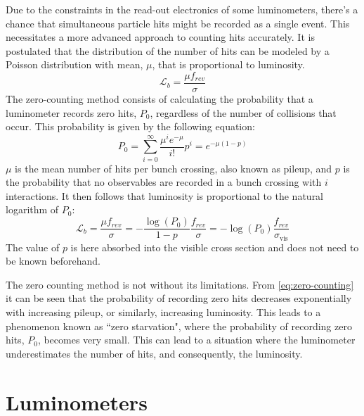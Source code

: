 Due to the constraints in the read-out electronics of some luminometers, there's a chance that simultaneous particle hits might be recorded as a single event. This necessitates a more advanced approach to counting hits accurately. It is postulated that the distribution of the number of hits can be modeled by a Poisson distribution \cite{TheLHCbcollaboration_2014} with mean, $\mu$, that is proportional to luminosity.
\begin{equation}
    \label{eq:luminosity-from-hits}
    \mathcal{L}_b = \frac{\mu f_{rev}}{\sigma}
\end{equation}
The zero-counting method consists of calculating the probability that a luminometer records zero hits, $P_0$, regardless of the number of collisions that occur. This probability is given by the following equation:
\begin{equation}
    \label{eq:zero-counting}
    P_0 = \sum_{i=0}^{\infty} \frac{\mu^i e^{-\mu}}{i!} p^i = e^{-\mu(1-p)}
\end{equation}
$\mu$ is the mean number of hits per bunch crossing, also known as pileup, and $p$ is the probability that no observables are recorded in a bunch crossing with $i$ interactions. It then follows that luminosity is proportional to the natural logarithm of $P_0$:
\begin{equation}
    \label{eq:luminosity-from-hits-2}
    \mathcal{L}_b = \frac{\mu f_{rev}}{\sigma} = - \frac{\log (P_0)}{1-p} \frac{f_{rev}}{\sigma} = - \log (P_0) \frac{f_{rev}}{\sigma_{\mathrm{vis}}}
\end{equation}
The value of $p$ is here absorbed into the visible cross section \cite{Sirunyan:2759951} and does not need to be known beforehand.

The zero counting method is not without its limitations. From \autoref{eq:zero-counting} it can be seen that the probability of recording zero hits decreases exponentially with increasing pileup, or similarly, increasing luminosity. This leads to a phenomenon known as ``zero starvation", where the probability of recording zero hits, $P_0$, becomes very small. This can lead to a situation where the luminometer underestimates the number of hits, and consequently, the luminosity.


\section{Luminometers}
\label{subsec:luminosity_detectors}

